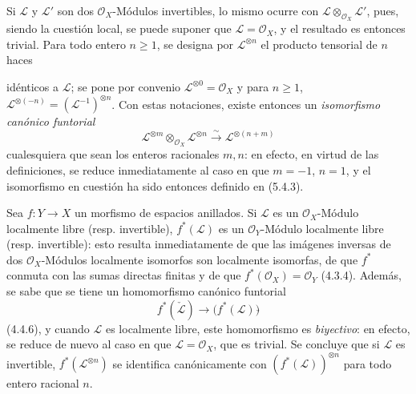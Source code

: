 \begin{env}[5.4.4]
\label{0.5.4.4-fr}
Si $\mathcal{L}$ y $\mathcal{L}'$ son dos $\mathcal{O}_X$-Módulos
invertibles, lo mismo ocurre con
$\mathcal{L}\otimes_{\mathcal{O}_X}\mathcal{L}'$, pues, siendo la cuestión
local, se puede suponer que $\mathcal{L}=\mathcal{O}_X$, y el resultado es
entonces trivial. Para todo entero $n\geq1$, se designa por
$\mathcal{L}^{\otimes n}$ el producto tensorial de $n$ haces


idénticos a $\mathcal{L}$; se pone por convenio
$\mathcal{L}^{\otimes0}=\mathcal{O}_X$ y para $n\geq1$,
$\mathcal{L}^{\otimes(-n)}=(\mathcal{L}^{-1})^{\otimes n}$. Con estas
notaciones, existe entonces un \emph{isomorfismo canónico funtorial}
\[
  \mathcal{L}^{\otimes m}\otimes_{\mathcal{O}_X}\mathcal{L}^{\otimes n}
  \xrightarrow{\sim}
  \mathcal{L}^{\otimes(n+m)}
  \tag{5.4.4.1}\label{0.5.4.4.1-fr}
\]
cualesquiera que sean los enteros racionales $m,n$: en efecto, en virtud de las
definiciones, se reduce inmediatamente al caso en que $m=-1$, $n=1$, y
el isomorfismo en cuestión ha sido entonces definido en (5.4.3).
\end{env}

\begin{env}[5.4.5]
Sea $f:Y\to X$ un morfismo de espacios anillados. Si $\mathcal{L}$ es un
$\mathcal{O}_X$-Módulo localmente libre (resp. invertible),
$f^*(\mathcal{L})$ es un $\mathcal{O}_Y$-Módulo localmente libre (resp.
invertible): esto resulta inmediatamente de que las imágenes inversas de dos
$\mathcal{O}_X$-Módulos localmente isomorfos son localmente isomorfas, de
que $f^*$ conmuta con las sumas directas finitas y de que
$f^*(\mathcal{O}_X)=\mathcal{O}_Y$ (4.3.4). Además, se sabe que se tiene un
homomorfismo canónico funtorial
\[
  f^*(\check{\mathcal{L}})
  \longrightarrow
  \bigl(f^*(\mathcal{L})\bigr)\check{}
\]
(4.4.6), y cuando $\mathcal{L}$ es localmente libre, este homomorfismo es
\emph{biyectivo}: en efecto, se reduce de nuevo al caso en que
$\mathcal{L}=\mathcal{O}_X$, que es trivial. Se concluye que si
$\mathcal{L}$ es invertible, $f^*(\mathcal{L}^{\otimes n})$ se identifica
canónicamente con $(f^*(\mathcal{L}))^{\otimes n}$ para todo entero racional
$n$.
\end{env}

